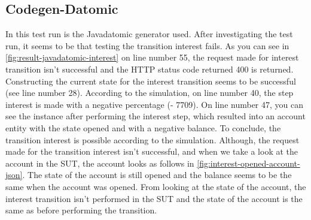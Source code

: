 \subsection{Codegen-Datomic}
\label{sec:bug-interest-javadatomic}
In this test run is the Javadatomic generator used. After investigating the test
run, it seems to be that testing the transition interest fails. As you can see
in \autoref{fig:result-javadatomic-interest} on line number 55, the request made
for interest transition isn't successful and the HTTP status code returned 400
is returned. Constructing the current state for the interest transition seems to
be successful (see line number 28). According to the simulation, on line number
40, the step interest is made with a negative percentage (- 7709). On line
number 47, you can see the instance after performing the interest step, which
resulted into an account entity with the state opened and with a negative
balance. To conclude, the transition interest is possible according to the
simulation. Although, the request made for the transition interest isn't
successful, and when we take a look at the account in the SUT, the account looks
as follows in \autoref{fig:interest-opened-account-json}. The state of the
account is still opened and the balance seems to be the same when the account
was opened. From looking at the state of the account, the interest transition
isn't performed in the SUT and the state of the account is the same as before
performing the transition.



